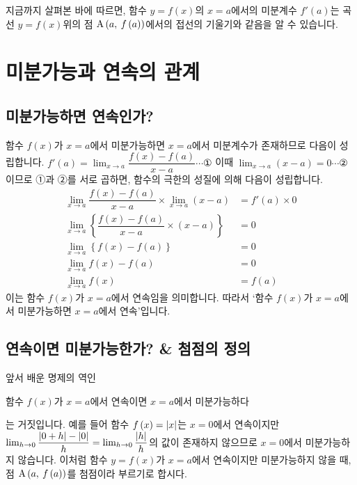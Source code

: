 지금까지 살펴본 바에 따르면, 함수 $y=f\left( x \right) $의 $x=a$에서의 미분계수 $f'\left( a \right) $는 곡선 $y=f\left( x \right) $위의 점 $\xy[A]{a}{f\left( a \right) }$에서의 접선의 기울기와 같음을  알 수 있습니다.

\section{미분가능과 연속의 관계}

\subsection{미분가능하면 연속인가?}
함수 $f\left( x \right) $가 $x=a$에서 미분가능하면 $x=a$에서 미분계수가 존재하므로 다음이 성립합니다.
$f'\left( a \right) = \lim_{x \to a} \dfrac{f\left( x \right) -f\left( a \right) }{x-a} \cdots \text{①}$
이때 $\lim_{x \to a} \left( x-a \right) = 0 \cdots \text{②}$이므로 ①과 ②를 서로 곱하면, 함수의 극한의 성질에 의해 다음이 성립합니다.
\begin{align*}
    \lim_{x \to a} \dfrac{f\left( x \right) -f\left( a \right) }{x-a} \times \lim_{x \to a} \left( x-a \right)
    &= f'\left( a \right) \times 0\\
    \lim_{x \to a} \left\{ \dfrac{f\left( x \right) -f\left( a \right) }{x-a}\times \left( x-a \right) \right\} &= 0 \\
    \lim_{x \to a} \left\{ f\left( x \right) -f\left( a \right) \right\}   &= 0 \\
    \lim_{x \to a} f\left( x \right) - f\left( a \right)    &= 0 \\
    \lim_{x \to a} f\left( x \right) &= f\left( a \right) 
\end{align*}
이는 함수 $f\left( x \right) $가 $x=a$에서 연속임을 의미합니다. 따라서 `함수 $f\left( x \right) $가 $x=a$에서 미분가능하면 $x=a$에서 연속'입니다.
\clearpage
\subsection{연속이면 미분가능한가? \& 첨점의 정의}
앞서 배운 명제의 역인\begin{center}
    함수 $f\left( x \right) $가 $x=a$에서 연속이면 $x=a$에서 미분가능하다
\end{center}는 거짓입니다. 예를 들어 함수 $f\left( x \right) =\abs{x}$는 $x=0$에서 연속이지만 $\lim_{h \to 0} \dfrac{\abs{0+h} - \abs0}{h}=\lim_{h \to 0} \dfrac{\abs{h}}{h}$의 값이 존재하지 않으므로 $x=0$에서 미분가능하지 않습니다. 이처럼 함수 $y=f\left( x \right) $가 $x=a$에서 연속이지만 미분가능하지 않을 때, 점 $\xy[A]{a}{f\left( a \right) }$를 첨점이라 부르기로 합시다.


